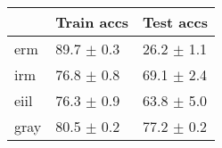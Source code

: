 \begin{tabular}{lll}
\toprule
{} &      Train accs &       Test accs \\
\midrule
erm  &  89.7 $\pm$ 0.3 &  26.2 $\pm$ 1.1 \\
irm  &  76.8 $\pm$ 0.8 &  69.1 $\pm$ 2.4 \\
eiil &  76.3 $\pm$ 0.9 &  63.8 $\pm$ 5.0 \\
gray &  80.5 $\pm$ 0.2 &  77.2 $\pm$ 0.2 \\
\bottomrule
\end{tabular}

